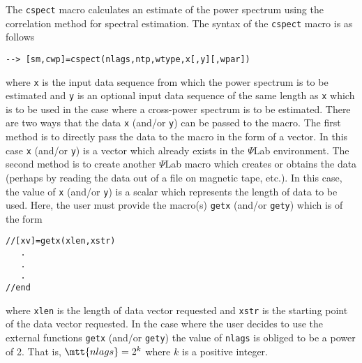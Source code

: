 	The {\tt cspect} macro calculates an estimate of
the power spectrum using the correlation method for spectral estimation.
The syntax of the {\tt cspect} macro is as follows
\begin{verbatim}
--> [sm,cwp]=cspect(nlags,ntp,wtype,x[,y][,wpar])
\end{verbatim}
where {\tt x} is the input data sequence from which the power spectrum
is to be estimated and {\tt y} is an optional input data sequence of the
same length as {\tt x} which is to be used in the case where a cross-power
spectrum is to be estimated.  There are two ways that the data {\tt x}
(and/or {\tt y}) can be passed to the macro.  The first method is to directly
pass the data to the macro in the form of a vector. In this case {\tt x}
(and/or {\tt y}) is a vector which already exists in the $\Psi$Lab environment.
The second method is to create another $\Psi$Lab macro which creates or obtains
the data (perhaps by reading the data out of a file on magnetic tape, etc.).
In this case, the value of {\tt x} (and/or {\tt y}) 
is a scalar which represents
the length of data to be used.  Here, the user must provide the macro(s)
{\tt getx} (and/or {\tt gety}) which is of the form
\begin{verbatim}
//[xv]=getx(xlen,xstr)
   .
   .
   .
//end
\end{verbatim}
where {\tt xlen} is the length of data vector requested and {\tt xstr} is the
starting point of the data vector requested.  In the case where the user
decides to use the external functions {\tt getx} (and/or {\tt gety})
the value of {\tt nlags} is obliged to be a power of 2.  That is,
$\mtt{nlags}=2^k$ where $k$ is a positive integer.


